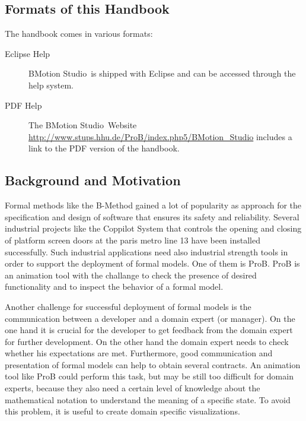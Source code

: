 \documentclass[12pt]{book}
\newcommand{\bms}{BMotion Studio}
\begin{document}
\subsection{Formats of this Handbook}

The handbook comes in various formats:

\begin{description}
	\item[Eclipse Help] \bms~is shipped with Eclipse and can be accessed through the help system.
	\item[PDF Help] The \bms~Website \url{http://www.stups.hhu.de/ProB/index.php5/BMotion_Studio} includes a link to the PDF version of the handbook.
\end{description}

\subsection{Background and Motivation}

Formal methods like the B-Method gained a lot of popularity as approach for the specification and design of software that ensures its safety and reliability. Several industrial projects like the Coppilot System that controls the opening and closing of platform screen doors at the paris metro line 13 have been installed successfully. Such industrial applications need also industrial strength tools in order to support the deployment of formal models. One of them is ProB. ProB is an animation tool with the challange to check the presence of desired functionality and to inspect the behavior of a formal model.

Another challenge for successful deployment of formal models is the communication between a developer and a domain expert (or manager). On the one hand it is crucial for the developer to get feedback from the domain expert for further development. On the other hand the domain expert needs to check whether his expectations are met. Furthermore, good communication and presentation of formal models can help to obtain several contracts. An animation tool like ProB could perform this task, but may be still too difficult for domain experts, because they also need a certain level of knowledge about the mathematical notation to understand the meaning of a specific state. To avoid this problem, it is useful to create domain specific visualizations.
\end{document}

